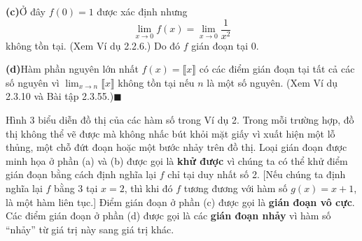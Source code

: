 \begin{minipage}[t]{0.73\textwidth}
    \textbf{(c)}\enspace Ở đây $f(0) = 1$ được xác định nhưng
    \[
    \lim_{x \to 0} f(x) = \lim_{x \to 0} \frac{1}{x^2}
    \]
    không tồn tại. (Xem Ví dụ 2.2.6.) Do đó $f$ gián đoạn tại 0.

    \textbf{(d)}\enspace Hàm phần nguyên lớn nhất $f(x) = \llbracket x \rrbracket$ có các điểm gián đoạn tại tất cả các số nguyên vì $\lim_{x \to n} \llbracket x \rrbracket$ không tồn tại nếu $n$ là một số nguyên. (Xem Ví dụ 2.3.10 và Bài tập 2.3.55.)\hfill{\color{stewartcyan}$\blacksquare$}

    \vspace{6pt}

    Hình 3 biểu diễn đồ thị của các hàm số trong Ví dụ 2. Trong mỗi trường hợp, đồ thị không thể vẽ được mà không nhấc bút khỏi mặt giấy vì xuất hiện một lỗ thủng, một chỗ đứt đoạn hoặc một bước nhảy trên đồ thị. Loại gián đoạn được minh họa ở phần (a) và (b) được gọi là \textbf{khử được} vì chúng ta có thể khử điểm gián đoạn bằng cách định nghĩa lại $f$ chỉ tại duy nhất số 2. [Nếu chúng ta định nghĩa lại $f$ bằng 3 tại $x = 2$, thì khi đó $f$ tương đương với hàm số $g(x) = x + 1$, là một hàm liên tục.] Điểm gián đoạn ở phần (c) được gọi là \textbf{gián đoạn vô cực}. Các điểm gián đoạn ở phần (d) được gọi là các \textbf{gián đoạn nhảy} vì hàm số “nhảy” từ giá trị này sang giá trị khác.
\end{minipage}

\vspace{0.8cm}

